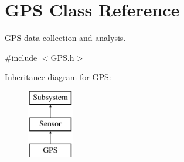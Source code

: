 \hypertarget{classGPS}{\section{G\-P\-S Class Reference}
\label{classGPS}
}


\hyperlink{classGPS}{G\-P\-S} data collection and analysis.  




{\ttfamily \#include $<$G\-P\-S.\-h$>$}

Inheritance diagram for G\-P\-S\-:\begin{figure}[H]
\begin{center}
\leavevmode
\includegraphics[height=3.000000cm]{classGPS}
\end{center}
\end{figure}
